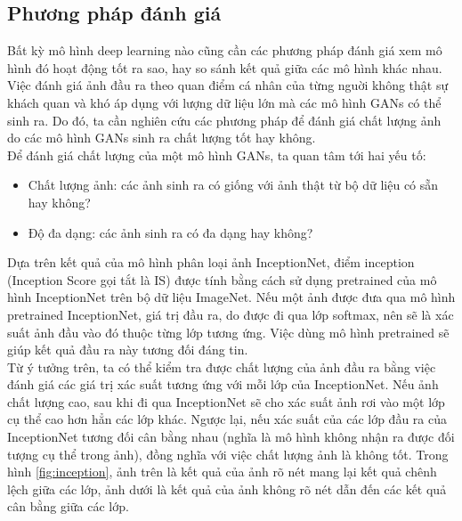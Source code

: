 {    \subsection{Phương pháp đánh giá}
    Bất kỳ mô hình deep learning nào cũng cần các phương pháp đánh giá xem mô hình đó hoạt động tốt ra sao, hay so sánh kết quả giữa các mô hình khác nhau. Việc đánh giá ảnh đầu ra theo quan điểm cá nhân của từng nguời không thật sự khách quan và khó áp dụng với lượng dữ liệu lớn mà các mô hình GANs có thể sinh ra. Do đó, ta cần nghiên cứu các phương pháp để đánh giá chất lượng ảnh do các mô hình GANs sinh ra chất lượng tốt hay không.\\
    Để đánh giá chất lượng của một mô hình GANs, ta quan tâm tới hai yếu tố:
    \begin{itemize}[leftmargin=0cm,itemindent=.5cm,labelwidth=\itemindent,labelsep=0cm,align=left]
        \item Chất lượng ảnh: các ảnh sinh ra có giống với ảnh thật từ bộ dữ liệu có sẵn hay không?
        \item Độ đa dạng: các ảnh sinh ra có đa dạng hay không?
    \end{itemize}
    Dựa trên kết quả của mô hình phân loại ảnh InceptionNet, điểm inception (Inception Score gọi tắt là IS) được tính bằng cách sử dụng pretrained của mô hình InceptionNet trên bộ dữ liệu ImageNet. Nếu một ảnh được đưa qua mô hình pretrained InceptionNet, giá trị đầu ra, do được đi qua lớp softmax, nên sẽ là xác suất ảnh đầu vào đó thuộc từng lớp tương ứng. Việc dùng mô hình pretrained sẽ giúp kết quả đầu ra này tương đối đáng tin.\\
    Từ ý tưởng trên, ta có thể kiểm tra được chất lượng của ảnh đầu ra bằng việc đánh giá các giá trị xác suất tương ứng với mỗi lớp của InceptionNet. Nếu ảnh chất lượng cao, sau khi đi qua InceptionNet sẽ cho xác suất ảnh rơi vào một lớp cụ thể cao hơn hẳn các lớp khác. Ngược lại, nếu xác suất của các lớp đầu ra của InceptionNet tương đối cân bằng nhau (nghĩa là mô hình không nhận ra được đối tượng cụ thể trong ảnh), đồng nghĩa với việc chất lượng ảnh là không tốt. Trong hình \ref{fig:inception}, ảnh trên là kết quả của ảnh rõ nét mang lại kết quả chênh lệch giữa các lớp, ảnh dưới là kết quả của ảnh không rõ nét dẫn đến các kết quả cân bằng giữa các lớp.\\
    
}
